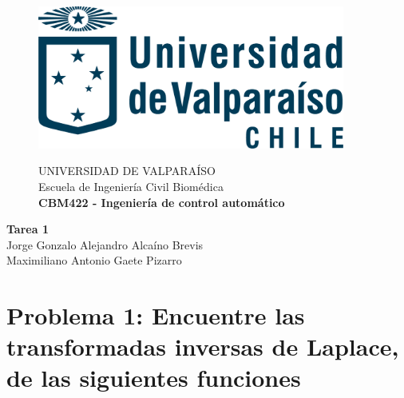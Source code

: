 \documentclass[10pt]{article}
\theoremstyle{definition}
\theoremstyle{remark}
\theoremstyle{definition}
\numberwithin{equation}{prob}
\begin{document}
\begin{sloppypar}

\end{sloppypar}

\begin{titlepage}
	\begin{figure}
		\begin{minipage}{4cm}
			\includegraphics[width=0.9\textwidth]{./figures/logo}
		\end{minipage}
		\begin{minipage}{11cm}
			\vspace{4mm}
			{\sc UNIVERSIDAD DE VALPARAÍSO}\\
			Escuela de Ingeniería Civil Biomédica\\
			{\bf CBM422 - Ingeniería de control automático}\\
			\vspace{0mm}
			\hrulefill
		\end{minipage}
	\end{figure}
	\phantom{""}\vspace{60mm}


	\begin{center}
		\Huge{\textbf{Tarea 1}}\vspace{95mm}\\
		\raggedleft \Large{Jorge Gonzalo Alejandro Alcaíno Brevis}\\
		\raggedleft \Large{Maximiliano Antonio Gaete Pizarro}\\
	\end{center}


\end{titlepage}



\section{Problema 1: Encuentre las transformadas inversas de Laplace, de las siguientes funciones}
\end{document}
